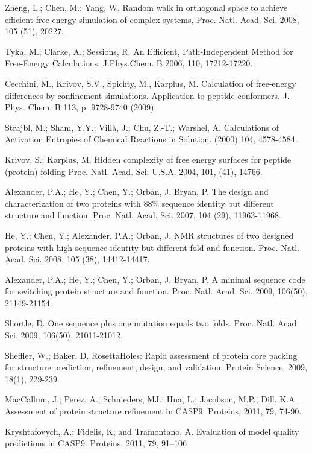 \documentclass[12pt]{article}
\begin{document}
\begin{thebibliography}{99}
Zheng, L.; Chen, M.; Yang, W. Random walk in orthogonal space to achieve efficient free-energy simulation of complex systems, Proc. Natl. Acad. Sci. 2008, 105 (51), 20227.

Tyka, M.; Clarke, A.; Sessions, R. An Efficient, Path-Independent Method for Free-Energy Calculations. J.Phys.Chem. B 2006, 110, 17212-17220.

Cecchini, M., Krivov, S.V., Spichty, M., Karplus, M. Calculation of free-energy differences by confinement simulations. Application to peptide conformers. 
J. Phys. Chem. B 113, p. 9728-9740 (2009).

Strajbl, M.; Sham, Y.Y.; Villà, J.; Chu, Z.-T.; Warshel, A. Calculations of Activation Entropies of Chemical Reactions 
in Solution. (2000) 104, 4578-4584.  

Krivov, S.; Karplus, M. Hidden complexity of free energy surfaces for peptide (protein) folding Proc. Natl. Acad. Sci. U.S.A. 2004, 101, (41), 14766.

Alexander, P.A.; He, Y.; Chen, Y.; Orban, J. Bryan, P. The design and characterization of two proteins with $88 \%$ sequence identity but different 
structure and function. Proc. Natl. Acad. Sci. 2007, 104 (29), 11963-11968.

He, Y.; Chen, Y.; Alexander, P.A.; Orban, J. NMR structures of two designed proteins with high sequence identity but different fold and function. Proc. Natl. Acad. Sci. 2008, 105 (38), 14412-14417.

Alexander, P.A.; He, Y.; Chen, Y.; Orban, J. Bryan, P. A minimal sequence code for switching protein structure and function. Proc. Natl. Acad. Sci. 2009, 106(50), 21149-21154.

Shortle, D. One sequence plus one mutation equals two folds. Proc. Natl. Acad. Sci. 2009, 106(50), 21011-21012. 

Sheffler, W.; Baker, D. RosettaHoles: Rapid assessment of protein core packing for structure prediction, refinement, design, and validation. Protein Science. 2009, 18(1), 229-239.


MacCallum, J.; Perez, A.; Schnieders, MJ.; Hua, L.; Jacobson, M.P.; Dill, K.A. Assessment of protein structure refinement 
in CASP9. Proteins, 2011, 79, 74-90.

Kryshtafovych, A.; Fidelis, K; and Tramontano, A. Evaluation of model quality predictions in CASP9. Proteins, 2011, 79, 91–106


\end{thebibliography}
\end{document}
